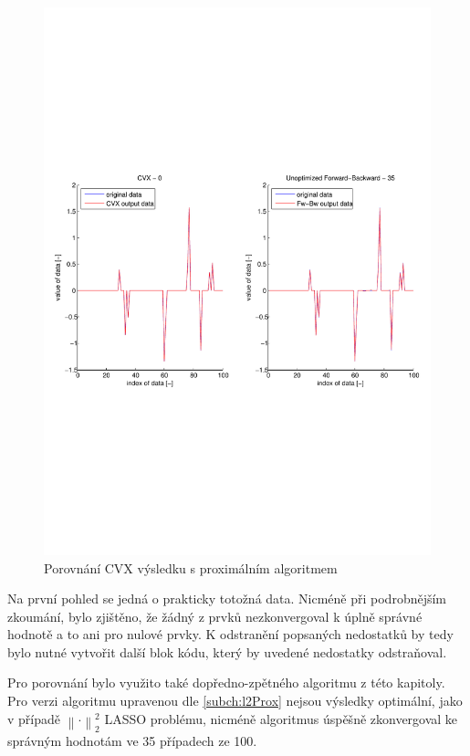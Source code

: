 \documentclass[FM,BP]{tulthesis}
\begin{document}
\begin{figure}[!ht]
	\begin{center}
		\includegraphics[scale=0.7]{obr/cvxvsprox.pdf}
	\end{center}
	\caption{Porovnání CVX výsledku s proximálním algoritmem}
	\label{fig:cvx}
\end{figure} 

Na první pohled se jedná o prakticky totožná data. Nicméně při podrobnějším zkoumání, bylo zjištěno, že žádný z prvků nezkonvergoval k úplně správné hodnotě a to ani pro nulové prvky. K odstranění popsaných nedostatků by tedy bylo nutné vytvořit další blok kódu, který by uvedené nedostatky odstraňoval. 

Pro porovnání bylo využito také dopředno-zpětného algoritmu z této kapitoly. Pro verzi algoritmu upravenou dle \ref{subch:l2Prox} nejsou výsledky optimální, jako v případě $\left\| \cdot \right\| _{2}^{2}$ LASSO problému, nicméně algoritmus úspěšně zkonvergoval ke správným hodnotám ve 35 případech ze 100.
\end{document}
